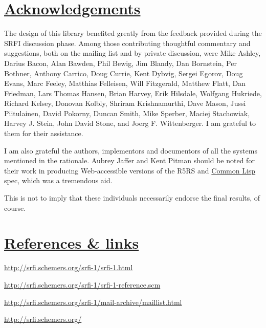 \section{\texorpdfstring{\href{}{Acknowledgements}}{Acknowledgements}}\label{acknowledgements}

The design of this library benefited greatly from the feedback provided
during the SRFI discussion phase. Among those contributing thoughtful
commentary and suggestions, both on the mailing list and by private
discussion, were Mike Ashley, Darius Bacon, Alan Bawden, Phil Bewig, Jim
Blandy, Dan Bornstein, Per Bothner, Anthony Carrico, Doug Currie, Kent
Dybvig, Sergei Egorov, Doug Evans, Marc Feeley, Matthias Felleisen, Will
Fitzgerald, Matthew Flatt, Dan Friedman, Lars Thomas Hansen, Brian
Harvey, Erik Hilsdale, Wolfgang Hukriede, Richard Kelsey, Donovan
Kolbly, Shriram Krishnamurthi, Dave Mason, Jussi Piitulainen, David
Pokorny, Duncan Smith, Mike Sperber, Maciej Stachowiak, Harvey J. Stein,
John David Stone, and Joerg F. Wittenberger. I am grateful to them for
their assistance.

I am also grateful the authors, implementors and documentors of all the
systems mentioned in the rationale. Aubrey Jaffer and Kent Pitman should
be noted for their work in producing Web-accessible versions of the R5RS
and \protect\hyperlink{CommonLisp}{Common Lisp} spec, which was a
tremendous aid.

This is not to imply that these individuals necessarily endorse the
final results, of course.

\section{\texorpdfstring{\href{}{References \&
links}}{References \& links}}\label{references-links}

\begin{description}
\tightlist
\item[This document, in HTML: ]
\href{srfi-1.html}{http://srfi.schemers.org/srfi-1/srfi-1.html}
\item[Source code for the reference implementation: ]
\href{srfi-1-reference.scm}{http://srfi.schemers.org/srfi-1/srfi-1-reference.scm}
\item[Archive of SRFI-1 discussion-list email: ]
\href{mail-archive/maillist.html}{http://srfi.schemers.org/srfi-1/mail-archive/maillist.html}
\item[SRFI web site: ]
\url{http://srfi.schemers.org/}
\end{description}

